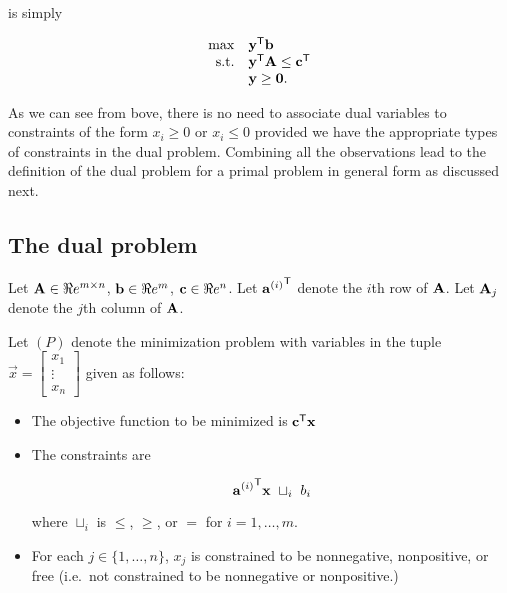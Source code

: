 is simply

\begin{equation*}
\begin{array}{rl}
\max & \mathbf{y}^{\mathsf{T}}\mathbf{b} \\
\mbox{s.t.} & \mathbf{y}^{\mathsf{T}}\mathbf{A} \leq \mathbf{c}^{\mathsf{T}} \\
& \mathbf{y} \geq \mathbf{0}.
\end{array}
\end{equation*}

As we can see from bove, there is no need to associate dual variables to
constraints of the form \(x_i \geq 0\) or \(x_i \leq 0\) provided we
have the appropriate types of constraints in the dual problem. Combining
all the observations lead to the definition of the dual problem for a
primal problem in general form as discussed next.

\hypertarget{primal-dual}{\subsection{The dual problem}\label{primal-dual}}

Let \(\mathbf{A} \in \Re e^{m\times n}\), \(\mathbf{b} \in \Re e^m\),
\(\mathbf{c} \in \Re e^n\). Let \({\mathbf{a}^{(i)}}^{\mathsf{T}}\) denote the \(i\)th row
of \(\mathbf{A}\). Let \(\mathbf{A}_j\) denote the \(j\)th column of \(\mathbf{A}\).

Let \((P)\) denote the minimization problem with variables in the tuple
\(\vec{x} = \begin{bmatrix} x_1\\ \vdots \\ x_n\end{bmatrix}\) given as
follows:

\begin{itemize}
\item
  The objective function to be minimized is \(\mathbf{c}^{\mathsf{T}} \mathbf{x}\)
\item
  The constraints are

  \begin{equation*}{\mathbf{a}^{(i)}}^{\mathsf{T}}\mathbf{x}~\sqcup_i~b_i
  \end{equation*}

  where \(\sqcup_i\) is \(\leq\), \(\geq\), or \(=\) for
  \(i = 1,\ldots, m\).
\item
  For each \(j \in \{1,\ldots,n\}\), \(x_j\) is constrained to be
  nonnegative, nonpositive, or free (i.e.~not constrained to be
  nonnegative or nonpositive.)
\end{itemize}


